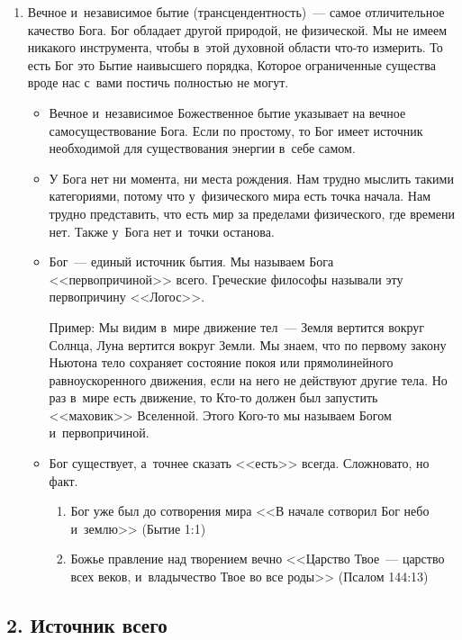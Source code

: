 \documentclass[a4paper,12pt]{article}
\begin{document}
\begin{enumerate}
    \item Вечное и~независимое бытие (трансцендентность)~--- самое отличительное качество Бога. Бог обладает другой природой, не физической. Мы не имеем никакого инструмента, чтобы в~этой духовной области что-то измерить. То есть Бог это Бытие наивысшего порядка, Которое ограниченные существа вроде нас с~вами постичь полностью не могут. 
    
    \begin{itemize}
        \item Вечное и~независимое Божественное бытие указывает на вечное самосуществование Бога. Если по простому, то Бог имеет источник необходимой для существования энергии в~себе самом.
        \item У Бога нет ни момента, ни места рождения. Нам трудно мыслить такими категориями, потому что у~физического мира есть точка начала. Нам трудно представить, что есть мир за пределами физического, где времени нет. Также у~Бога нет и~точки останова.
        \item Бог~--- единый источник бытия. Мы называем Бога <<первопричиной>> всего. Греческие философы называли эту первопричину <<Логос>>. 
        
        Пример: Мы видим в~мире движение тел~--- Земля вертится вокруг Солнца, Луна вертится вокруг Земли. Мы знаем, что по первому закону Ньютона тело сохраняет состояние покоя или прямолинейного равноускоренного движения, если на него не действуют другие тела. Но раз в~мире есть движение, то Кто-то должен был запустить <<маховик>> Вселенной. Этого Кого-то мы называем Богом и~первопричиной.
        \item Бог существует, а~точнее сказать <<есть>> всегда. Сложновато, но факт.
        \begin{enumerate}
            \item Бог уже был до сотворения мира <<В начале сотворил Бог небо и~землю>> (Бытие 1:1)
            \item Божье правление над творением вечно <<Царство Твое~--- царство всех веков, и~владычество Твое во все роды>> (Псалом 144:13)
        \end{enumerate}
    \end{itemize}
\end{enumerate}
        
\subsection{2. Источник всего}        
            
\end{document}
